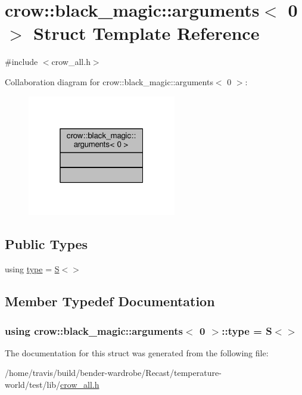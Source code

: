 \hypertarget{structcrow_1_1black__magic_1_1arguments_3_010_01_4}{\section{crow\-:\-:black\-\_\-magic\-:\-:arguments$<$ 0 $>$ Struct Template Reference}
\label{structcrow_1_1black__magic_1_1arguments_3_010_01_4}
}


{\ttfamily \#include $<$crow\-\_\-all.\-h$>$}



Collaboration diagram for crow\-:\-:black\-\_\-magic\-:\-:arguments$<$ 0 $>$\-:
\nopagebreak
\begin{figure}[H]
\begin{center}
\leavevmode
\includegraphics[width=184pt]{structcrow_1_1black__magic_1_1arguments_3_010_01_4__coll__graph}
\end{center}
\end{figure}
\subsection*{Public Types}
\begin{DoxyCompactItemize}
\item 
using \hyperlink{structcrow_1_1black__magic_1_1arguments_3_010_01_4_a7dbe1eb49310da0250373648f1e87f9d}{type} = \hyperlink{structcrow_1_1black__magic_1_1_s}{S}$<$$>$
\end{DoxyCompactItemize}


\subsection{Member Typedef Documentation}
\hypertarget{structcrow_1_1black__magic_1_1arguments_3_010_01_4_a7dbe1eb49310da0250373648f1e87f9d}{
\subsubsection[{type}]{\setlength{\rightskip}{0pt plus 5cm}using {\bf crow\-::black\-\_\-magic\-::arguments}$<$ 0 $>$\-::{\bf type} =  {\bf S}$<$$>$}}\label{structcrow_1_1black__magic_1_1arguments_3_010_01_4_a7dbe1eb49310da0250373648f1e87f9d}


The documentation for this struct was generated from the following file\-:\begin{DoxyCompactItemize}
\item 
/home/travis/build/bender-\/wardrobe/\-Recast/temperature-\/world/test/lib/\hyperlink{crow__all_8h}{crow\-\_\-all.\-h}\end{DoxyCompactItemize}
